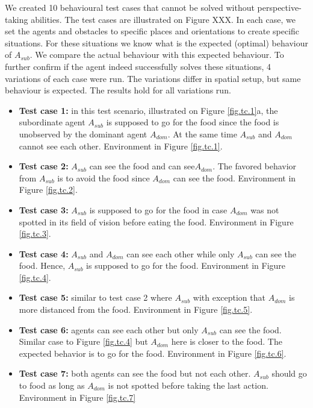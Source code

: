 \documentclass{article}
\begin{document}
We created 10 behavioural test cases that cannot be solved without perspective-taking abilities. The test cases are illustrated on Figure XXX. In each case, we set the agents and obstacles to specific places and orientations to create specific situations. For these situations we know what is the expected (optimal) behaviour of $A_{sub}$. We compare the actual behaviour with this expected behaviour. To further confirm if the agent indeed successfully solves these situations, 4 variations of each case were run. The variations differ in spatial setup, but same behaviour is expected. The results hold for all variations run.
\begin{itemize}

\item \textbf {Test case 1:} in this test scenario, illustrated on Figure \ref{fig.tc.1}a, the subordinate agent \(A_{sub}\) is supposed to go for the food since the food is unobserved by the dominant agent \(A_{dom}\). At the same time \(A_{sub}\) and \(A_{dom}\) cannot see each other. Environment in Figure \ref{fig.tc.1}.

\item \textbf {Test case 2:} \(A_{sub}\) can see the food and can see\(A_{dom}\). The favored behavior from \(A_{sub}\) is to avoid the food since \(A_{dom}\) can see the food. Environment in Figure \ref{fig.tc.2}.

\item \textbf {Test case 3:} \(A_{sub}\) is supposed to go for the food in case \(A_{dom}\) was not spotted in its field of vision before eating the food. Environment in Figure \ref{fig.tc.3}.

\item \textbf {Test case 4:} \(A_{sub}\) and \(A_{dom}\) can see each other while only \(A_{sub}\) can see the food. Hence, \(A_{sub}\) is supposed to go for the food. Environment in Figure \ref{fig.tc.4}.

\item \textbf {Test case 5:} similar to test case 2 where \(A_{sub}\) with exception that \(A_{dom}\) is more distanced from the food. Environment in Figure \ref{fig.tc.5}.

\item \textbf {Test case 6:} agents can see each other but only \(A_{sub}\) can see the food. Similar case to Figure \ref{fig.tc.4} but \(A_{dom}\) here is closer to the food. The expected behavior is to go for the food. Environment in Figure \ref{fig.tc.6}.

\item \textbf {Test case 7:} both agents can see the food but not each other. \(A_{sub}\) should go to food as long as \(A_{dom}\) is not spotted before taking the last action. Environment in Figure \ref{fig.tc.7}


\end{itemize}
\end{document}
